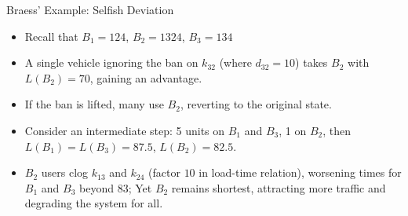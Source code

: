 \documentclass[10pt]{beamer}
\begin{document}
\begin{frame}{Braess' Example: Selfish Deviation}

  \begin{center}
  \end{center}
  \onslide<+->
  \begin{itemize}[<+->]
    \item Recall that $B_1 = 124$, $B_2 = 1324$, $B_3 = 134$
    \item A single vehicle ignoring the ban on $k_{32}$ (where $d_{32} = 10$) takes $B_2$ with $L(B_2) = 70$, gaining an advantage.
    \item If the ban is lifted, many use $B_2$, reverting to the original state. 
    \item Consider an intermediate step: 5 units on $B_1$ and $B_3$, 1 on $B_2$, then $L(B_1) = L(B_3) = 87.5$, $L(B_2) = 82.5$.
    \item $B_2$ users clog $k_{13}$ and $k_{24}$ (factor $10$ in load-time relation), worsening times for $B_1$ and $B_3$ beyond $83$; Yet $B_2$ remains shortest, attracting more traffic and degrading the system for all.
  \end{itemize}
\end{frame}
\end{document}

